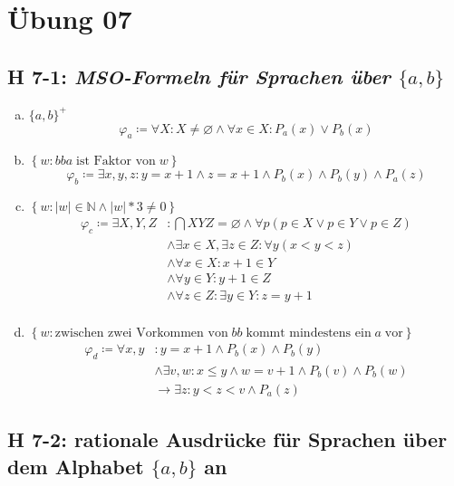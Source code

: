 \documentclass{scrartcl}
\begin{document}
\section{Übung 07}

\subsection{H 7-1: \textsl{MSO-Formeln für Sprachen über $\{a,b\}$}}

\begin{enumerate}[(a)]
    \item $\{a,b\}^+$
    $$\varphi_a \coloneqq \forall X : X \neq \varnothing \land \forall x \in X : P_a(x) \lor P_b(x)$$
    \item $\left\{w : bba \;\text{ist Faktor von}\;w\right\}$
    $$\varphi_b \coloneqq \exists x,y,z : y = x+1 \land z = x+1 \land P_b(x) \land P_b(y) \land P_a(z)$$
    \item $\left\{w : |w| \in \mathbb{N} \land |w|*3 \neq 0  \right\}$
    \begin{align*}
        \varphi_c \coloneqq \exists X,Y,Z &: \bigcap XYZ = \varnothing \land \forall p \left(p \in X \lor p \in Y \lor p \in Z\right)\\
            &\land \exists x \in X, \exists z \in Z : \forall y\left(x < y < z\right)\\
            &\land \forall x \in X : x + 1 \in Y\\
            &\land \forall y \in Y : y + 1 \in Z\\
            &\land \forall z \in Z : \exists y \in Y : z = y + 1\\
    \end{align*}
    \item $\left\{w : \text{zwischen zwei Vorkommen von}\;bb\;\text{kommt mindestens ein}\;a\;\text{vor}\right\}$
    \begin{align*}
        \varphi_d \coloneqq \forall x,y &: y = x+1 \land P_b(x) \land P_b(y)\\
                    &\land \exists v,w : x \leq y \land w = v+1 \land P_b(v) \land P_b(w)\\
                    &\rightarrow \exists z : y < z < v \land P_a(z)
    \end{align*}
\end{enumerate}

\subsection{H 7-2: rationale Ausdrücke für Sprachen über dem Alphabet $\{a,b\}$ an}
\end{document}
